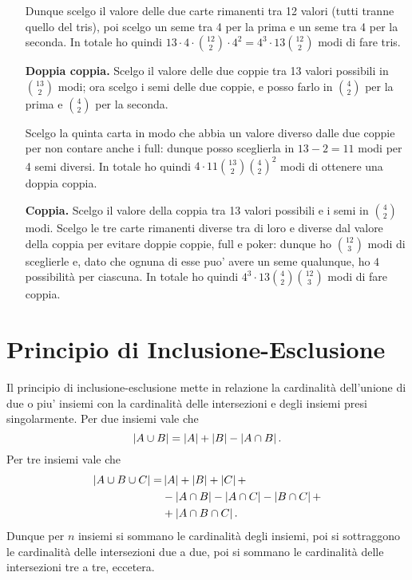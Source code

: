\begin{itemize}
    Dunque scelgo il valore delle due carte rimanenti tra 12 valori (tutti tranne quello del tris), poi scelgo un seme tra 4 per la prima e un seme tra 4 per la seconda. In totale ho quindi $13 \cdot 4 \cdot \binom{12}{2} \cdot 4^2 = 4^3 \cdot 13 \binom{12}{2}$ modi di fare tris.
    \item[\textbf{Doppia coppia.}] Scelgo il valore delle due coppie tra 13 valori possibili in $\binom{13}{2}$ modi; ora scelgo i semi delle due coppie, e posso farlo in $\binom{4}{2}$ per la prima e $\binom{4}{2}$ per la seconda. 
    
    Scelgo la quinta carta in modo che abbia un valore diverso dalle due coppie per non contare anche i full: dunque posso sceglierla in $13 - 2 = 11$ modi per 4 semi diversi. In totale ho quindi $4 \cdot 11\binom{13}{2}\binom{4}{2}^2$ modi di ottenere una doppia coppia.
    \item[\textbf{Coppia.}] Scelgo il valore della coppia tra 13 valori possibili e i semi in $\binom{4}{2}$ modi. Scelgo le tre carte rimanenti diverse tra di loro e diverse dal valore della coppia per evitare doppie coppie, full e poker: dunque ho $\binom{12}{3}$ modi di sceglierle e, dato che ognuna di esse puo' avere un seme qualunque, ho $4$ possibilità per ciascuna. In totale ho quindi $4^3 \cdot 13 \binom{4}{2} \binom{12}{3}$ modi di fare coppia.
\end{itemize}

\section{Principio di Inclusione-Esclusione}

Il principio di inclusione-esclusione mette in relazione la cardinalità dell'unione di due o piu' insiemi con la cardinalità delle intersezioni e degli insiemi presi singolarmente. Per due insiemi vale che \begin{equation}
    \left|A \cup B\right| = \left|A\right| + \left|B\right| - \left|A \cap B\right|.
\end{equation}
Per tre insiemi vale che \begin{alignat*}{1}
    \left|A \cup B \cup C\right| = 
        &\left|A\right| + \left|B\right| + \left|C\right| +\\
        &- \left|A \cap B\right| - \left|A \cap C\right| - \left|B \cap C\right| +\\
        &+ \left|A \cap B \cap C\right|.
\end{alignat*}
Dunque per $n$ insiemi si sommano le cardinalità degli insiemi, poi si sottraggono le cardinalità delle intersezioni due a due, poi si sommano le cardinalità delle intersezioni tre a tre, eccetera.

